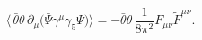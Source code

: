 \begin{equation}\label{Axial_Anomaly}
\langle\,\bar\theta\theta\,
\partial_\mu \Big(\bar\Psi \gamma^\mu\gamma_5\Psi\Big)\rangle
= - \bar\theta\theta\,\frac{1}{8\pi^2} F_{\mu\nu}\tilde F^{\mu\nu}.
\end{equation}


